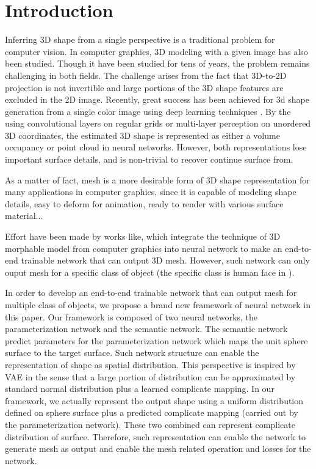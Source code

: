  \section{Introduction}
Inferring 3D shape from a single perspective is a traditional problem for computer vision.  In computer graphics, 3D modeling with a given image has also been studied. Though it have been studied for tens of years, the problem remains challenging in both fields. The challenge arises from the fact that 3D-to-2D projection is not invertible and large portions of the 3D shape features are excluded in the 2D image. Recently, great success has been achieved for 3d shape generation from a single color image using deep learning techniques
\cite{3DR2N2,PSGN}. By the using convolutional layers on regular grids or multi-layer
perception on unordered 3D coordinates, the estimated 3D shape is represented
as either a volume occupancy \cite{3DR2N2} or point cloud \cite{PSGN} in neural networks. However, both representations lose important
surface details, and is non-trivial to recover continue surface from.

As a matter of fact, mesh is a more desirable form of 3D shape representation for many applications in computer graphics, since it is capable of
modeling shape details, easy to deform for animation, ready to render with various surface material...


Effort have been made by works like\cite{endface}, which integrate the technique of 3D morphable model from computer graphics into neural network to make an end-to-end trainable network that can output 3D mesh. However, such network can only ouput mesh for a specific class of object (the specific class is human face in \cite{endface}).

In order to develop an end-to-end trainable network that can output mesh for multiple class of objects, we propose a brand new framework of neural network in this paper. Our framework is composed of two neural networks, the parameterization network and the semantic network.  The semantic network predict parameters for the parameterization network which maps the unit sphere surface to the target surface. Such network structure can enable the representation of shape as spatial distribution. This perspective is inspired by VAE\cite{VAE} in the sense that a large portion of distribution can be approximated by standard normal distribution plus a learned complicate mapping. In our framework, we actually represent the output shape using a uniform distribution defined on sphere surface plus a predicted complicate mapping (carried out by the parameterization network). These two combined can represent complicate distribution of surface. Therefore, such representation can enable the network to generate mesh as output and enable the mesh related operation and losses for the network.



